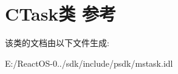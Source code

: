 \hypertarget{class_c_task}{}\section{C\+Task类 参考}
\label{class_c_task}


该类的文档由以下文件生成\+:\begin{DoxyCompactItemize}
\item 
E\+:/\+React\+O\+S-\/0../sdk/include/psdk/mstask.\+idl\end{DoxyCompactItemize}
